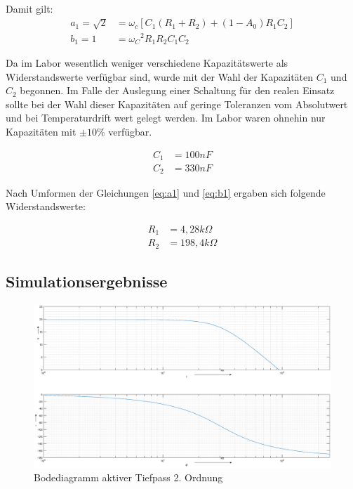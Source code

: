 Damit gilt: 
\begin{align}
    a_1 = \sqrt{2} &= \omega_c[C_1(R_1+R_2) + (1-A_0)R_1C_2] \label{eq:a1}\\
    b_1 = 1 &= {\omega_C}^2R_1R_2C_1C_2 \label{eq:b1}
\end{align}

Da im Labor wesentlich weniger verschiedene Kapazitätswerte als Widerstandswerte verfügbar sind, wurde mit der Wahl der Kapazitäten $C_1$ und $C_2$ begonnen. Im Falle der Auslegung einer Schaltung für den realen Einsatz sollte bei der Wahl dieser Kapazitäten auf geringe Toleranzen vom Absolutwert und bei Temperaturdrift wert gelegt werden. Im Labor waren ohnehin nur Kapazitäten mit $\pm10\%$ verfügbar. 

\begin{align}
    C_1 &= 100nF \\
    C_2 &= 330nF
\end{align}

Nach Umformen der Gleichungen \ref{eq:a1} und \ref{eq:b1} ergaben sich folgende Widerstandswerte:

\begin{align}
    R_1 &= 4,28k\Omega \\
    R_2 &= 198,4 k\Omega
\end{align}



\subsection{Simulationsergebnisse}
\begin{figure}[h]
    \centering
    \includegraphics[width = \costumPicWidth]{Lab_3/Plots/sallen_key.eps}
    \caption{Bodediagramm aktiver Tiefpass 2. Ordnung}
    \label{fig:my_label}
\end{figure}